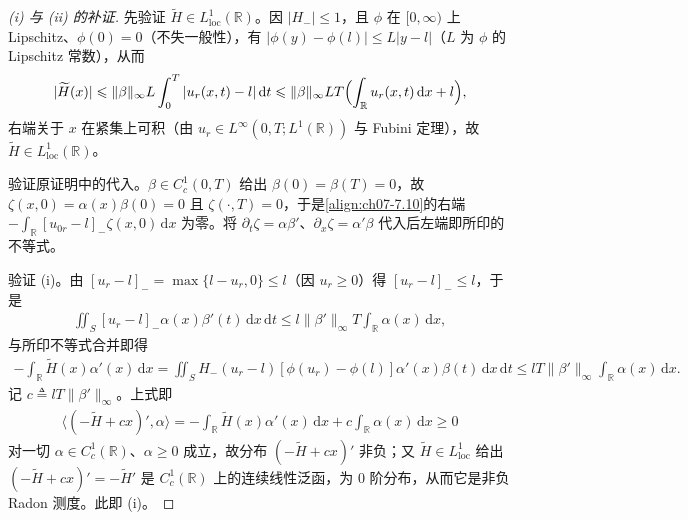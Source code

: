 \documentclass[../../main.tex]{subfiles}%
\begin{document}
\begin{proof}[(i) 与 (ii) 的补证]
先验证 $\widetilde H\in L^1_{\mathrm{loc}}(\mathbb{R})$。因 $|H_-|\leqslant1$，且 $\phi$ 在 $[0,\infty)$ 上 Lipschitz、$\phi(0)=0$（不失一般性），有 $|\phi(y)-\phi(l)|\leqslant L|y-l|$（$L$ 为 $\phi$ 的 Lipschitz 常数），从而
\begin{align*}
|\widetilde H(x)|\leqslant\|\beta\|_\infty L\int_0^T|u_r(x,t)-l|\,\mathrm{d}t
\leqslant\|\beta\|_\infty LT\Bigl(\int_{\mathbb{R}}u_r(x,t)\,\mathrm{d}x+l\Bigr),
\end{align*}
右端关于 $x$ 在紧集上可积（由 $u_r\in L^\infty(0,T;L^1(\mathbb{R}))$ 与 Fubini 定理），故 $\widetilde H\in L^1_{\mathrm{loc}}(\mathbb{R})$。

验证原证明中的代入。$\beta\in C^1_c(0,T)$ 给出 $\beta(0)=\beta(T)=0$，故 $\zeta(x,0)=\alpha(x)\beta(0)=0$ 且 $\zeta(\cdot,T)=0$，于是\eqref{align:ch07-7.10}的右端 $-\int_{\mathbb{R}}[u_{0r}-l]_-\zeta(x,0)\,\mathrm{d}x$ 为零。将 $\partial_t\zeta=\alpha\beta'$、$\partial_x\zeta=\alpha'\beta$ 代入后左端即所印的不等式。

验证 (i)。由 $[u_r-l]_-=\max\{l-u_r,0\}\leqslant l$（因 $u_r\geqslant0$）得 $[u_r-l]_-\leqslant l$，于是
\begin{align*}
\iint_S[u_r-l]_-\alpha(x)\beta'(t)\,\mathrm{d}x\,\mathrm{d}t
\leqslant l\|\beta'\|_\infty T\int_{\mathbb{R}}\alpha(x)\,\mathrm{d}x,
\end{align*}
与所印不等式合并即得
\begin{align*}
-\int_{\mathbb{R}}\widetilde H(x)\alpha'(x)\,\mathrm{d}x
=\iint_S H_-(u_r-l)[\phi(u_r)-\phi(l)]\alpha'(x)\beta(t)\,\mathrm{d}x\,\mathrm{d}t
\leqslant lT\|\beta'\|_\infty\int_{\mathbb{R}}\alpha(x)\,\mathrm{d}x.
\end{align*}
记 $c\triangleq lT\|\beta'\|_\infty$。上式即
\begin{align*}
\langle(-\widetilde H+cx)',\alpha\rangle
=-\int_{\mathbb{R}}\widetilde H(x)\alpha'(x)\,\mathrm{d}x+c\int_{\mathbb{R}}\alpha(x)\,\mathrm{d}x\geqslant0
\end{align*}
对一切 $\alpha\in C^1_c(\mathbb{R})$、$\alpha\geqslant0$ 成立，故分布 $(-\widetilde H+cx)'$ 非负；又 $\widetilde H\in L^1_{\mathrm{loc}}$ 给出 $(-\widetilde H+cx)'=-\widetilde H'$ 是 $C^1_c(\mathbb{R})$ 上的连续线性泛函，为 $0$ 阶分布，从而它是非负 Radon 测度。此即 (i)。


\end{proof}
\end{document}
